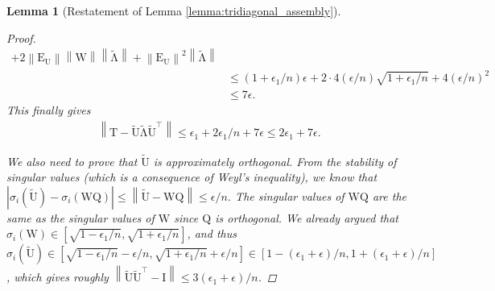 \documentclass{article}
\newcommand{\lnorm}{\left\|}
\newcommand{\rnorm}{\right\|}
\newcommand{\lbrac}{\left[}
\newcommand{\rbrac}{\right]}
\newtheorem{lemma}{Lemma}[section]
\newcommand\matE{\boldsymbol{\mathrm{E}}}
\newcommand\matI{\boldsymbol{\mathrm{I}}}
\newcommand\matQ{\boldsymbol{\mathrm{Q}}}
\newcommand\matT{\boldsymbol{\mathrm{T}}}
\newcommand\matU{\boldsymbol{\mathrm{U}}}
\newcommand\matW{\boldsymbol{\mathrm{W}}}
\newcommand\matUtilde{\widetilde{\boldsymbol{\mathrm{U}}}}
\newcommand\matLambdatilde{\widetilde{\boldsymbol{\mathrm{\Lambda}}}}
\begin{document}
\begin{lemma}[Restatement of Lemma \ref{lemma:tridiagonal_assembly}]
\begin{proof}
\begin{align*}
            +
            2
            \lnorm
                \matE_{\matU}
            \rnorm
            \lnorm
            \matW
            \rnorm
            \lnorm \matLambdatilde \rnorm
            +
            \lnorm
                \matE_{\matU}
            \rnorm^2
            \lnorm \matLambdatilde \rnorm
            \\
            &\leq
            (1+\epsilon_1/n)
            \epsilon
            +
            2\cdot 4
            (\epsilon/n)
            \sqrt{1+\epsilon_1/n}
            +
            4
            (\epsilon/n)^2
            \\
            &\leq 7\epsilon.
        \end{align*}
        This finally gives
        \begin{align*}
            \lnorm\matT-\matUtilde\matLambdatilde\matUtilde^\top\rnorm
            \leq
            \epsilon_1 + 2\epsilon_1/n + 7\epsilon \leq 2\epsilon_1 + 7\epsilon.
        \end{align*}

        We also need to prove that $\matUtilde$ is approximately orthogonal. From the stability of singular values (which is a consequence of Weyl's inequality), we know that $|\sigma_i(\matUtilde)-\sigma_i(\matW\matQ)| \leq \lnorm \matUtilde-\matW\matQ\rnorm \leq \epsilon/n$. The singular values of $\matW\matQ$ are the same as the singular values of $\matW$ since $\matQ$ is orthogonal. We already argued  that $\sigma_i(\matW)\in\lbrac
            \sqrt{1-\epsilon_1/n},\sqrt{1+\epsilon_1/n}
        \rbrac$, and thus
        $\sigma_i(\matUtilde)\in\lbrac
            \sqrt{1-\epsilon_1/n}-\epsilon/n,\sqrt{1+\epsilon_1/n}+\epsilon/n
        \rbrac\in\lbrac
            1-(\epsilon_1+\epsilon)/n,1+(\epsilon_1+\epsilon)/n
        \rbrac$, which gives roughly $\lnorm \matUtilde\matUtilde^\top-\matI\rnorm
        \leq 
        3(\epsilon_1+\epsilon)/n$.
    \end{proof}
\end{lemma}
\end{document}
